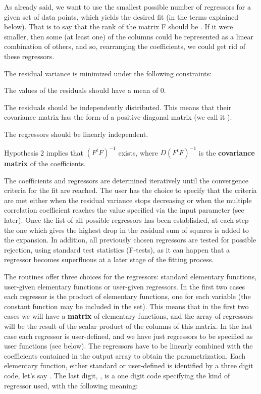 As already said, we want to use the smallest possible number of regressors
for a given set of data points, which yields the desired fit (in the
terms explained below).
That is to say that the rank of the matrix F should be .
If it were smaller, then some (at least one) of the columns
could be represented as a linear combination of others, and so, rearranging
the coefficients, we could get rid of these regressors.
 
The residual variance is minimized under the following constraints:
\begin{OL}
\item The  values of the residuals should have a mean of 0.
\item The residuals should be independently distributed.
This means that their covariance matrix has the form of a positive
diagonal matrix (we call it ).
\item The regressors should be linearly independent.
\end{OL}
Hypothesis 2 implies that $(F^t F)^{-1}$ exists, where
$D (F^t F)^{-1}$ is the {\bf covariance matrix} of the coefficients.
 
The coefficients and regressors are determined iteratively until the
convergence criteria for the fit are reached.
The user has the choice to specify
that the criteria are met either when the residual variance stops
decreasing or when the multiple correlation coefficient reaches the
value specified via the input parameter  (see later).
Once the list of all possible regressors has been established,
at each step the one which gives the highest drop in
the residual sum of squares is added to the expansion.
In addition, all previously chosen regressors are tested for
possible rejection, using standard test statistics (F-tests),
as it can happen that a regressor becomes superfluous
at a later stage of the fitting process.
 
The routines offer three choices for the regressors: standard
elementary functions, user-given elementary functions or user-given regressors.
In the first two cases each regressor is the product of  elementary
functions, one for each variable (the constant function may be included
in the set).
This means that in the first two cases we will have a {\bf matrix} of
 elementary functions, and the array of regressors will
be the result of the scalar product of the  columns of this
matrix.
In the last case each regressor is user-defined, and we have just
 regressors to be specified as user functions (see below).
The 
regressors have to be linearly combined with the  coefficients
contained in the output array  to obtain the parametrization.
Each elementary function, either standard or user-defined is identified
by a three digit code, let's say  .
The last digit, , is a one digit
code specifying the kind of regressor used, with the following meaning:

